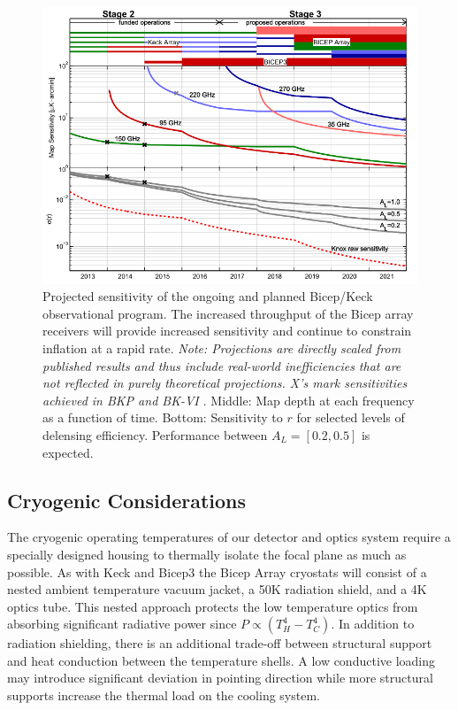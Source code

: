 \documentclass[12pt]{article}
\begin{document}
\begin{figure}
	\center
	\includegraphics[width=.8\textwidth]{projections.png}
	\caption{Projected sensitivity of the ongoing and planned Bicep/Keck
	observational program. The increased throughput of the Bicep array
	receivers will provide increased sensitivity and continue to constrain
	inflation at a rapid rate. \textit{Note: Projections are directly scaled
	from published results and thus include real-world inefficiencies that are
	not reflected in purely theoretical projections. X's mark sensitivities
	achieved in BKP and BK-VI \cite{BK6, cite:BKP}}. Middle: Map depth at each
	frequency as a function of time. Bottom: Sensitivity to $r$ for selected
	levels of delensing efficiency. Performance between $A_L = [0.2, 0.5]$ is
	expected.}
	\label{fig:projections}
\end{figure}


\subsection{Cryogenic Considerations}
The cryogenic operating temperatures of our detector and optics system require
a specially designed housing to thermally isolate the focal plane as much as
possible. As with Keck and Bicep3 the Bicep Array cryostats will consist of a
nested ambient temperature vacuum jacket, a 50K radiation shield, and a 4K
optics tube. This nested approach protects the low temperature optics
from absorbing significant radiative power since $P\propto (T_{H}^4-T_{C}^4)$.
In addition to radiation shielding, there is an additional trade-off between
structural support and heat conduction between the temperature shells. A low
conductive loading may introduce significant deviation in pointing direction
while more structural supports increase the thermal load on the cooling
system. 
\end{document}
